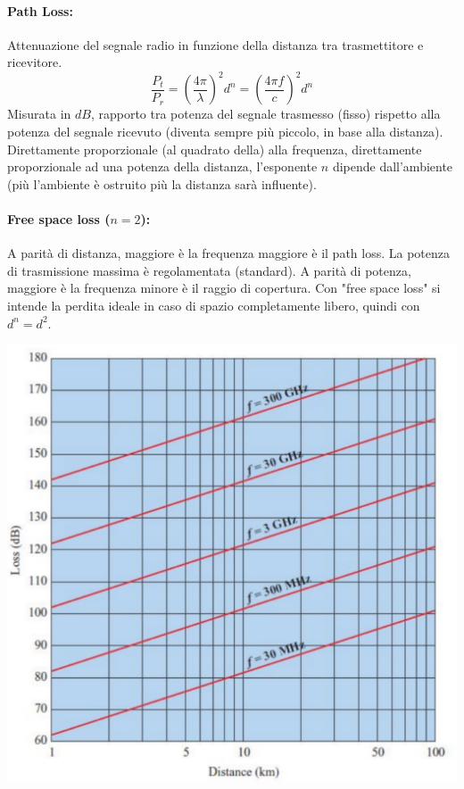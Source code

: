 \paragraph{Path Loss:} Attenuazione del segnale radio in funzione della distanza tra trasmettitore e ricevitore.
$$ \frac{P_t}{P_r} = \left(\frac{4 \pi}{\lambda}\right)^2 d^n = \left(\frac{4 \pi f}{c}\right)^2 d^n $$
Misurata in $dB$, rapporto tra potenza del segnale trasmesso (fisso) rispetto alla potenza del segnale ricevuto (diventa sempre più piccolo, in base alla distanza).\\

Direttamente proporzionale (al quadrato della) alla frequenza, direttamente proporzionale ad una potenza della distanza, l'esponente $n$ dipende dall'ambiente (più l'ambiente è ostruito più la distanza sarà influente).\\


\newpage

\paragraph{Free space loss ($n=2$):} A parità di distanza, maggiore è la frequenza maggiore è il path loss. La potenza di trasmissione massima è regolamentata (standard). A parità di potenza, maggiore è la frequenza minore è il raggio di copertura. Con "free space loss" si intende la perdita ideale in caso di spazio completamente libero, quindi con $d^n = d^2$.
\begin{center}
	\includegraphics[width=0.75\linewidth]{img/wireless/freespaceloss}
\end{center}

